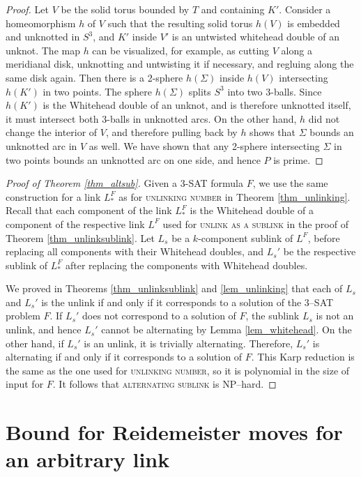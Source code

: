 \documentclass[12pt]{amsart}
\theoremstyle{definition}
\theoremstyle{remark}
\begin{document}
\begin{proof}
Let $V$ be the solid torus bounded by $T$ and containing $K'$.
Consider a homeomorphism $h$ of $V$ such that the resulting solid torus $h(V)$ is embedded and unknotted in $S^3$, and $K'$ inside $V'$ is an untwisted whitehead double of an unknot.
The map $h$ can be visualized, for example, as cutting $V$ along a meridianal disk, unknotting and untwisting it if necessary, and regluing along the same disk again.
Then there is a 2-sphere $h(\Sigma)$ inside $h(V)$ intersecting $h(K')$ in two points.
The sphere $h(\Sigma)$ splits $S^3$ into two 3-balls.
Since $h(K')$ is the Whitehead double of an unknot, and is therefore unknotted itself, it must intersect both 3-balls in unknotted arcs.
On the other hand, $h$ did not change the interior of $V$, and therefore pulling back by $h$ shows that $\Sigma$ bounds an unknotted arc in $V$ as well.
We have shown that any 2-sphere intersecting $\Sigma$ in two points bounds an unknotted arc on one side, and hence $P$ is prime.
\end{proof}

\begin{proof}[Proof of Theorem \ref{thm_altsub}]
Given a 3-SAT formula $F$, we use the same construction for a link $L^F_*$ as for \textsc{unlinking number} in Theorem \ref{thm_unlinking}.
Recall that each component of the link $L^F_*$ is the Whitehead double of a component of the respective link $L^F$ used for \textsc{unlink as a sublink} in the proof of Theorem \ref{thm_unlinksublink}.
Let $L_s$ be a $k$-component sublink of $L^F$, before replacing all components with their Whitehead doubles, and $L_s'$ be the respective sublink of $L^F_*$ after replacing the components with Whitehead doubles.

We proved in Theorems \ref{thm_unlinksublink} and \ref{lem_unlinking} that each of $L_s$ and $L_s'$ is the unlink if and only if it corresponds to a solution of the 3--\textsc{SAT} problem $F$.
If $L_s'$ does not correspond to a solution of $F$, the sublink $L_s$ is not an unlink, and hence $L_s'$ cannot be alternating by Lemma \ref{lem_whitehead}.
On the other hand, if $L_s'$ is an unlink, it is trivially alternating.
Therefore, $L_s'$ is alternating if and only if it corresponds to a solution of $F$.
This Karp reduction is the same as the one used for \textsc{unlinking number}, so it is polynomial in the size of input for $F$.
It follows that \textsc{alternating sublink} is NP--hard.
\end{proof}

\section{Bound for Reidemeister moves for an arbitrary link}
\label{sec_reidbound}
\end{document}
